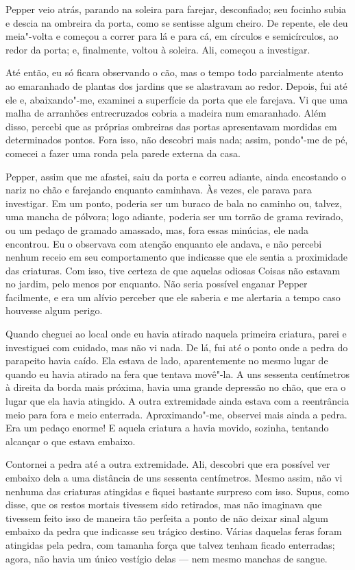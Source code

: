 Pepper veio atrás, parando na soleira para farejar, desconfiado; seu focinho subia e descia na ombreira da porta, como
se sentisse algum cheiro. De repente, ele deu meia"-volta e começou a correr para lá e para cá, em círculos e
semicírculos, ao redor da porta; e, finalmente, voltou à soleira. Ali, começou a investigar.

Até então, eu só ficara observando o cão, mas o tempo todo parcialmente atento ao emaranhado de plantas dos jardins que
se alastravam ao redor. Depois, fui até ele e, abaixando"-me, examinei a superfície da porta que ele farejava. Vi que
uma malha de arranhões entrecruzados cobria a madeira num emaranhado. Além disso, percebi que as próprias ombreiras
das portas apresentavam mordidas em determinados pontos. Fora isso, não descobri mais nada; assim, pondo"-me de pé,
comecei a fazer uma ronda pela parede externa da casa.

Pepper, assim que me afastei, saiu da porta e correu adiante, ainda encostando o nariz no chão e farejando enquanto
caminhava. Às vezes, ele parava para investigar. Em um ponto, poderia ser um buraco de bala no caminho ou, talvez, uma
mancha de pólvora; logo adiante, poderia ser um torrão de grama revirado, ou um pedaço de gramado amassado, mas, fora
essas minúcias, ele nada encontrou. Eu o observava com atenção enquanto ele andava, e não percebi nenhum receio em seu
comportamento que indicasse que ele sentia a proximidade das criaturas. Com isso, tive certeza de que aquelas odiosas
Coisas não estavam no jardim, pelo menos por enquanto. Não seria possível enganar Pepper facilmente, e era um alívio
perceber que ele saberia e me alertaria a tempo caso houvesse algum perigo.

Quando cheguei ao local onde eu havia atirado naquela primeira criatura, parei e investiguei com cuidado, mas não
vi nada. De lá, fui até o ponto onde a pedra do parapeito havia caído. Ela estava de lado, aparentemente no mesmo lugar
de quando eu havia atirado na fera que tentava movê"-la. A uns sessenta centímetros à direita da borda mais próxima,
havia uma grande depressão no chão, que era o lugar que ela havia atingido. A outra extremidade ainda estava com a
reentrância meio para fora e meio enterrada. Aproximando"-me, observei mais ainda a pedra. Era um pedaço enorme! E
aquela criatura a havia movido, sozinha, tentando alcançar o que estava embaixo.

Contornei a pedra até a outra extremidade. Ali, descobri que era possível ver embaixo dela a uma distância de uns
sessenta centímetros. Mesmo assim, não vi nenhuma das criaturas atingidas e fiquei bastante surpreso com isso.
Supus, como disse, que os restos mortais tivessem sido retirados, mas não imaginava que tivessem feito isso de
maneira tão perfeita a ponto de não deixar sinal algum embaixo da pedra que indicasse seu trágico destino. Várias
daquelas feras foram atingidas pela pedra, com tamanha força que talvez tenham ficado enterradas; agora, não havia
um único vestígio delas --- nem mesmo manchas de sangue.


